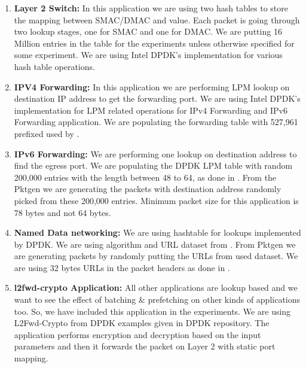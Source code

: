 \begin{enumerate}
\item \textbf{Layer 2 Switch:} In this application we are using two hash tables to store the mapping between SMAC/DMAC and value. Each packet is going through two lookup stages, one for SMAC and one for DMAC. We are putting 16 Million entries in the table for the experiments unless otherwise specified for some experiment. We are using Intel DPDK's implementation for various hash table operations.
\item \textbf{IPV4 Forwarding:} In this application we are performing LPM lookup on destination IP address to get the forwarding port. We are using Intel DPDK's implementation for LPM related operations for IPv4 Forwarding and IPv6 Forwarding application. We are populating the forwarding table with 527,961 prefixed used by \cite{189006}.
\item \textbf{IPv6 Forwarding:} We are performing one lookup on destination address to find the egress port. We are populating the DPDK LPM table with random 200,000 entries with the length between 48 to 64, as done in \cite{189006}. From the Pktgen we are generating the packets with destination address randomly picked from these 200,000 entries. Minimum packet size for this application is 78 bytes and not 64 bytes.
\item \textbf{Named Data networking:} We are using hashtable for lookups implemented by DPDK. We are using algorithm and URL dataset from \cite{DBLP:conf/globecom/ZhangWYLL13}. From Pktgen we are generating packets by randomly putting the URLs from used dataset. We are using 32 bytes URLs in the packet headers as done in \cite{189006}.
\item \textbf{l2fwd-crypto Application:} All other applications are lookup based and we want to see the effect of batching \& prefetching on other kinds of applications too. So, we have included this application in the experiments. We are using L2Fwd-Crypto\cite{l2crypto} from DPDK examples given in DPDK repository. The application performs encryption and decryption based on the input parameters and then it forwards the packet on Layer 2 with static port mapping. 
\end{enumerate}

